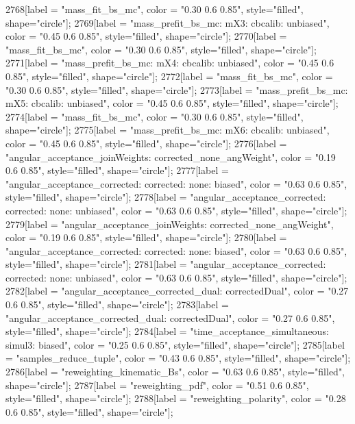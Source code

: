 {	2768[label = "mass_fit_bs_mc", color = "0.30 0.6 0.85", style="filled", shape="circle"];
	2769[label = "mass_prefit_bs_mc\nmassbin: mX3\nmassmodel: cbcalib\ntrigger: unbiased", color = "0.45 0.6 0.85", style="filled", shape="circle"];
	2770[label = "mass_fit_bs_mc", color = "0.30 0.6 0.85", style="filled", shape="circle"];
	2771[label = "mass_prefit_bs_mc\nmassbin: mX4\nmassmodel: cbcalib\ntrigger: unbiased", color = "0.45 0.6 0.85", style="filled", shape="circle"];
	2772[label = "mass_fit_bs_mc", color = "0.30 0.6 0.85", style="filled", shape="circle"];
	2773[label = "mass_prefit_bs_mc\nmassbin: mX5\nmassmodel: cbcalib\ntrigger: unbiased", color = "0.45 0.6 0.85", style="filled", shape="circle"];
	2774[label = "mass_fit_bs_mc", color = "0.30 0.6 0.85", style="filled", shape="circle"];
	2775[label = "mass_prefit_bs_mc\nmassbin: mX6\nmassmodel: cbcalib\ntrigger: unbiased", color = "0.45 0.6 0.85", style="filled", shape="circle"];
	2776[label = "angular_acceptance_joinWeights\nwflag: corrected_none_angWeight", color = "0.19 0.6 0.85", style="filled", shape="circle"];
	2777[label = "angular_acceptance_corrected\nangacc: corrected\ncsp: none\ntrigger: biased", color = "0.63 0.6 0.85", style="filled", shape="circle"];
	2778[label = "angular_acceptance_corrected\nangacc: corrected\ncsp: none\ntrigger: unbiased", color = "0.63 0.6 0.85", style="filled", shape="circle"];
	2779[label = "angular_acceptance_joinWeights\nwflag: corrected_none_angWeight", color = "0.19 0.6 0.85", style="filled", shape="circle"];
	2780[label = "angular_acceptance_corrected\nangacc: corrected\ncsp: none\ntrigger: biased", color = "0.63 0.6 0.85", style="filled", shape="circle"];
	2781[label = "angular_acceptance_corrected\nangacc: corrected\ncsp: none\ntrigger: unbiased", color = "0.63 0.6 0.85", style="filled", shape="circle"];
	2782[label = "angular_acceptance_corrected_dual\nstep: correctedDual", color = "0.27 0.6 0.85", style="filled", shape="circle"];
	2783[label = "angular_acceptance_corrected_dual\nstep: correctedDual", color = "0.27 0.6 0.85", style="filled", shape="circle"];
	2784[label = "time_acceptance_simultaneous\ntimeacc: simul3\ntrigger: biased", color = "0.25 0.6 0.85", style="filled", shape="circle"];
	2785[label = "samples_reduce_tuple", color = "0.43 0.6 0.85", style="filled", shape="circle"];
	2786[label = "reweighting_kinematic_Bs", color = "0.63 0.6 0.85", style="filled", shape="circle"];
	2787[label = "reweighting_pdf", color = "0.51 0.6 0.85", style="filled", shape="circle"];
	2788[label = "reweighting_polarity", color = "0.28 0.6 0.85", style="filled", shape="circle"];
}
